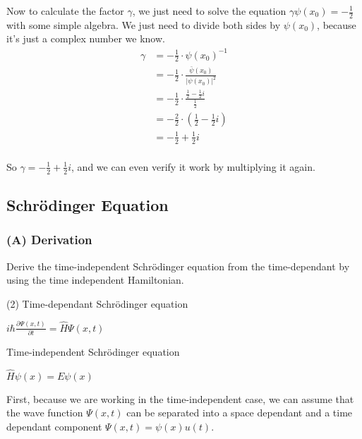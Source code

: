 \documentclass{article}
\begin{document}
  Now to calculate the factor $\gamma$, we just need to solve the equation $\gamma\psi(x_0) = -\frac{1}{2}$ with some simple algebra.
  We just need to divide both sides by $\psi(x_0)$, because it's just a complex number we know.
  \begin{align*}
    \gamma &= -\frac{1}{2} \cdot \psi(x_0)^{-1} \\
    &= -\frac{1}{2} \cdot \frac{\bar\psi(x_0)}{|\psi(x_0)|^2} \\
    &= -\frac{1}{2} \cdot \frac{\frac{1}{2} - \frac{1}{2}i}{\frac{1}{2}} \\
    &= -\frac{2}{2} \cdot \left(\frac{1}{2} - \frac{1}{2}i\right) \\
    &= -\frac{1}{2} + \frac{1}{2}i \\
  \end{align*}

  So $\gamma = -\frac{1}{2} + \frac{1}{2}i$, and we can even verify it work by multiplying it again.

  \subsection{Schrödinger Equation}
  \subsubsection*{(A) Derivation}
  \begin{centerframebox}
    Derive the time-independent Schrödinger equation from the time-dependant by using the time independent Hamiltonian.

    \begin{tasks}[style=itemize](2)
      \task Time-dependant Schrödinger equation \\
      \begin{center} $\displaystyle i\hbar \frac{\partial \Psi(x,t)}{\partial t}  = \hat{H} \Psi(x,t) $ \end{center}
      \task Time-independent Schrödinger equation \\
      \begin{center} $\displaystyle \hat{H} \psi(x) = E \psi(x) $ \end{center}
    \end{tasks}
  \end{centerframebox}
  First, because we are working in the time-independent case, we can assume that the wave function $\Psi(x,t)$
  can be separated into a space dependant and a time dependant component $\Psi(x,t) = \psi(x) u(t)$.
\end{document}
